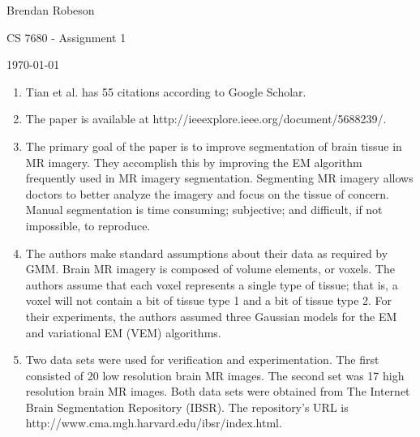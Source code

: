 \documentclass[11pt]{article}
\begin{document}
\noindent Brendan Robeson

\noindent CS 7680 - Assignment 1

\noindent \today

\medskip

\begin{enumerate}
    \item Tian et al. \cite{5688239} has 55 citations according to Google
        Scholar.

    \item The paper is available at
        http://ieeexplore.ieee.org/document/5688239/.

    \item The primary goal of the paper is to improve segmentation of brain
        tissue in MR imagery. They accomplish this by improving the EM algorithm
        frequently used in MR imagery segmentation. Segmenting MR imagery allows
        doctors to better analyze the imagery and focus on the tissue of
        concern. Manual segmentation is time consuming; subjective; and
        difficult, if not impossible, to reproduce.

    \item The authors make standard assumptions about their data as required by
        GMM. Brain MR imagery is composed of volume elements, or voxels. The
        authors assume that each voxel represents a single type of tissue; that
        is, a voxel will not contain a bit of tissue type 1 and a bit of tissue
        type 2. For their experiments, the authors assumed three Gaussian models
        for the EM and variational EM (VEM) algorithms.

    \item Two data sets were used for verification and experimentation. The
        first consisted of 20 low resolution brain MR images. The second set was
        17 high resolution brain MR images. Both data sets were obtained from
        The Internet Brain Segmentation Repository (IBSR). The repository's URL
        is http://www.cma.mgh.harvard.edu/ibsr/index.html.


\end{enumerate}
\end{document}
